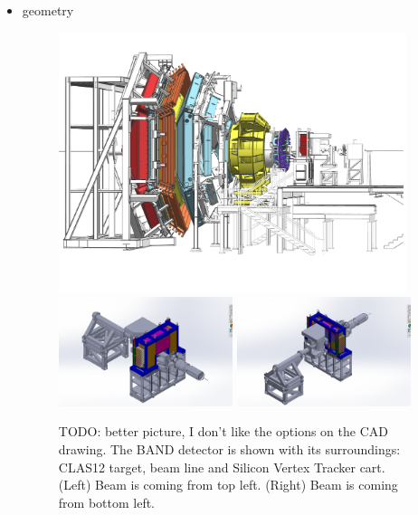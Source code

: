 \documentclass[review]{elsarticle}
\begin{document}
\begin{itemize}
\item geometry
\begin{figure}[thb]
\centering
\includegraphics[width=0.96\textwidth]{BandInClas.pdf}
\includegraphics[width=0.48\textwidth]{BandInContext1.png}
\includegraphics[width=0.48\textwidth]{BandInContext2.png}
 \caption{TODO: better picture, I don't like the options on the CAD drawing. The BAND detector is shown with its surroundings: CLAS12 target, beam line and Silicon Vertex Tracker cart. (Left) Beam is coming from top left. (Right) Beam is coming from bottom left. }
  \label{fig:bandcontext}
\end{figure}


\end{itemize}
\end{document}
